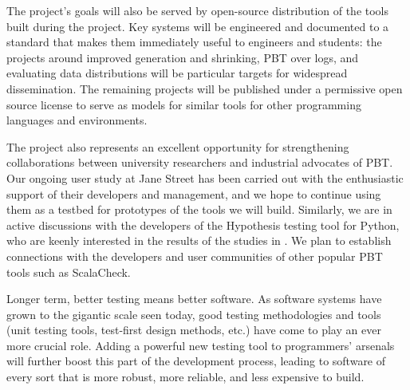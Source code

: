 \smallskip
{}
%
The project's goals will also be served by open-source distribution of the tools
built during the project. Key systems will be engineered and documented to a standard
that makes them immediately useful to engineers and students: the projects around
improved generation and shrinking, PBT over logs, and evaluating data
distributions will be particular targets for widespread
dissemination. The remaining projects will be published under a permissive
open source license to serve as models for similar tools for other programming languages and environments.

The project also represents an excellent opportunity for strengthening
collaborations between university researchers and industrial advocates of PBT.  Our
ongoing user study at Jane Street has been carried out with the
enthusiastic support of their developers and management, and we hope
to continue using them as a testbed for prototypes of the tools we
will build.  Similarly, we are in active discussions with the
developers of the Hypothesis testing tool for Python, who are keenly
interested in the results of the studies in
.  We plan to establish connections with the
developers and user communities of other popular PBT tools such as
ScalaCheck.

Longer term, better testing means better software.  As software
systems have grown to the gigantic scale seen today, good testing
methodologies and tools (unit testing tools, test-first design
methods, etc.) have come to play an ever more crucial role.  Adding a
powerful new testing tool to programmers' arsenals will further boost
this part of the development process, leading to software of every
sort that is more robust, more reliable, and less expensive to build.




